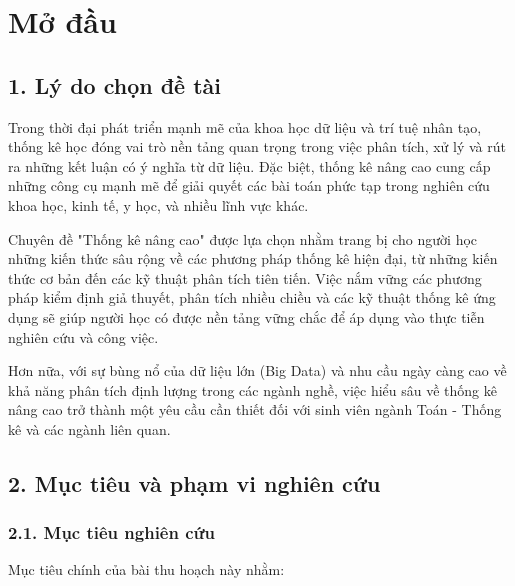 \chapter*{Mở đầu}

\section*{1. Lý do chọn đề tài}

Trong thời đại phát triển mạnh mẽ của khoa học dữ liệu và trí tuệ nhân tạo, thống kê học đóng vai trò nền tảng quan trọng trong việc phân tích, xử lý và rút ra những kết luận có ý nghĩa từ dữ liệu. Đặc biệt, thống kê nâng cao cung cấp những công cụ mạnh mẽ để giải quyết các bài toán phức tạp trong nghiên cứu khoa học, kinh tế, y học, và nhiều lĩnh vực khác.

Chuyên đề "Thống kê nâng cao" được lựa chọn nhằm trang bị cho người học những kiến thức sâu rộng về các phương pháp thống kê hiện đại, từ những kiến thức cơ bản đến các kỹ thuật phân tích tiên tiến. Việc nắm vững các phương pháp kiểm định giả thuyết, phân tích nhiều chiều và các kỹ thuật thống kê ứng dụng sẽ giúp người học có được nền tảng vững chắc để áp dụng vào thực tiễn nghiên cứu và công việc.

Hơn nữa, với sự bùng nổ của dữ liệu lớn (Big Data) và nhu cầu ngày càng cao về khả năng phân tích định lượng trong các ngành nghề, việc hiểu sâu về thống kê nâng cao trở thành một yêu cầu cần thiết đối với sinh viên ngành Toán - Thống kê và các ngành liên quan.

\section*{2. Mục tiêu và phạm vi nghiên cứu}

\subsection*{2.1. Mục tiêu nghiên cứu}

Mục tiêu chính của bài thu hoạch này nhằm:

